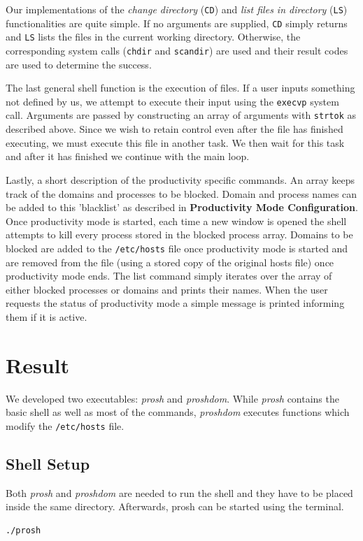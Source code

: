 \documentclass{article}
\begin{document}
Our implementations of the \textit{change directory} (\texttt{CD}) and \textit{list files in directory} (\texttt{LS}) functionalities are quite simple. If no arguments are supplied, \texttt{CD} simply returns and \texttt{LS} lists the files in the current working directory. Otherwise, the corresponding system calls (\texttt{chdir} and  \texttt{scandir}) are used and their result codes are used to determine the success.

The last general shell function is the execution of files. If a user inputs something not defined by us, we attempt to execute their input using the  \texttt{execvp} system call. Arguments are passed by constructing an array of arguments with \texttt{strtok} as described above. Since we wish to retain control even after the file has finished executing, we must execute this file in another task. We then wait for this task and after it has finished we continue with the main loop.

Lastly, a short description of the productivity specific commands. An array keeps track of the domains and processes to be blocked. Domain and process names can be added to this 'blacklist' as described in \textbf{Productivity Mode Configuration}. Once productivity mode is started, each time a new window is opened the shell attempts to kill every process stored in the blocked process array. Domains to be blocked are added to the  \texttt{/etc/hosts} file once productivity mode is started and are removed from the file (using a stored copy of the original hosts file) once productivity mode ends. The list command simply iterates over the array of either blocked processes or domains and prints their names. When the user requests the status of productivity mode a simple message is printed informing them if it is active.

\section{Result}

We developed two executables: \textit{prosh} and \textit{proshdom}. While \textit{prosh} contains the basic shell as well as most of the commands, \textit{proshdom} executes functions which modify the \texttt{/etc/hosts} file. 

\subsection{Shell Setup}

Both \textit{prosh} and \textit{proshdom} are needed to run the shell and they have to be placed inside the same directory. Afterwards, prosh can be started using the terminal.
\begin{lstlisting}[numbers=none]
./prosh
\end{lstlisting}
\end{document}
